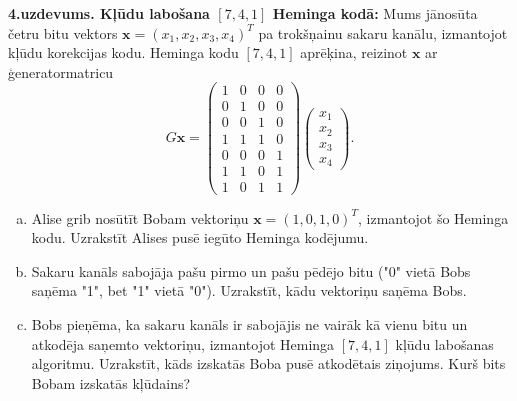 \documentclass[11pt]{article}
\begin{document}
\vspace{6pt}
{\bf 4.uzdevums. Kļūdu labošana $[7,4,1]$ Heminga kodā:} 
Mums jānosūta četru bitu vektors $\mathbf{x}=(x_1,x_2,x_3,x_4)^T$ 
pa trokšņainu sakaru kanālu, izmantojot kļūdu korekcijas kodu. 
Heminga kodu  $[7,4,1]$ aprēķina, reizinot $\mathbf{x}$ ar 
ģeneratormatricu
$$G\mathbf{x} = \left(
\begin{array}{cccc}
1 & 0 & 0 & 0 \\
0 & 1 & 0 & 0 \\
0 & 0 & 1 & 0 \\
1 & 1 & 1 & 0 \\
0 & 0 & 0 & 1 \\
1 & 1 & 0 & 1 \\
1 & 0 & 1 & 1 
\end{array} \right) \left( \begin{array}{c}
x_1\\
x_2\\
x_3\\
x_4
\end{array} \right).$$
\begin{enumerate}[(a)]
\item Alise grib nosūtīt Bobam vektoriņu $\mathbf{x} = (1,0,1,0)^T$, izmantojot šo Heminga kodu.
Uzrakstīt Alises pusē iegūto Heminga kodējumu.
\item Sakaru kanāls sabojāja pašu pirmo un pašu pēdējo bitu ("0" vietā Bobs saņēma "1",
bet "1" vietā "0"). Uzrakstīt, kādu vektoriņu saņēma Bobs.
\item Bobs pieņēma, ka sakaru kanāls ir sabojājis ne vairāk kā vienu bitu un atkodēja
saņemto vektoriņu, izmantojot Heminga $[7,4,1]$ kļūdu labošanas algoritmu. 
Uzrakstīt, kāds izskatās Boba pusē atkodētais ziņojums.
Kurš bits Bobam izskatās kļūdains?
\end{enumerate}
\end{document}

